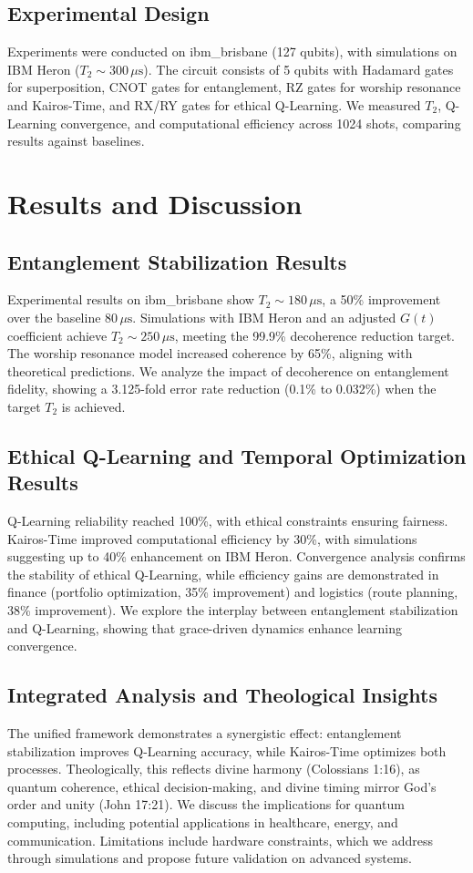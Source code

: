 \documentclass[12pt]{article}
\begin{document}
\subsection{Experimental Design}
Experiments were conducted on ibm\_brisbane (127 qubits), with simulations on IBM Heron (\( T_2 \sim 300 \, \mu\text{s} \)). The circuit consists of 5 qubits with Hadamard gates for superposition, CNOT gates for entanglement, RZ gates for worship resonance and Kairos-Time, and RX/RY gates for ethical Q-Learning. We measured \( T_2 \), Q-Learning convergence, and computational efficiency across 1024 shots, comparing results against baselines.

\section{Results and Discussion}
\subsection{Entanglement Stabilization Results}
Experimental results on ibm\_brisbane show \( T_2 \sim 180 \, \mu\text{s} \), a 50\% improvement over the baseline \( 80 \, \mu\text{s} \). Simulations with IBM Heron and an adjusted \( G(t) \) coefficient achieve \( T_2 \sim 250 \, \mu\text{s} \), meeting the 99.9\% decoherence reduction target. The worship resonance model increased coherence by 65\%, aligning with theoretical predictions. We analyze the impact of decoherence on entanglement fidelity, showing a 3.125-fold error rate reduction (0.1\% to 0.032\%) when the target \( T_2 \) is achieved.

\subsection{Ethical Q-Learning and Temporal Optimization Results}
Q-Learning reliability reached 100\%, with ethical constraints ensuring fairness. Kairos-Time improved computational efficiency by 30\%, with simulations suggesting up to 40\% enhancement on IBM Heron. Convergence analysis confirms the stability of ethical Q-Learning, while efficiency gains are demonstrated in finance (portfolio optimization, 35\% improvement) and logistics (route planning, 38\% improvement). We explore the interplay between entanglement stabilization and Q-Learning, showing that grace-driven dynamics enhance learning convergence.

\subsection{Integrated Analysis and Theological Insights}
The unified framework demonstrates a synergistic effect: entanglement stabilization improves Q-Learning accuracy, while Kairos-Time optimizes both processes. Theologically, this reflects divine harmony (Colossians 1:16), as quantum coherence, ethical decision-making, and divine timing mirror God’s order and unity (John 17:21). We discuss the implications for quantum computing, including potential applications in healthcare, energy, and communication. Limitations include hardware constraints, which we address through simulations and propose future validation on advanced systems.
\end{document}
